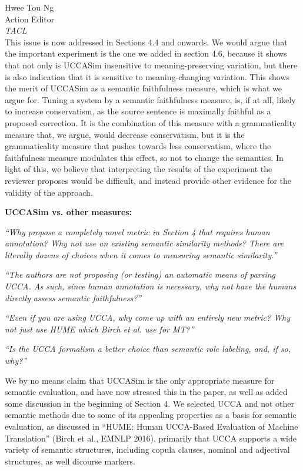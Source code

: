 \documentclass[11pt,letterpaper]{letter}
\begin{document}
\begin{letter}{%
Hwee Tou Ng\\
Action Editor\\
{\em TACL}\\
}
This issue is now addressed in Sections 4.4 and onwards.
We would argue that the important experiment is the one we added in section 4.6, because it shows that not only is UCCASim insensitive to meaning-preserving variation, but there is also indication that it is sensitive to meaning-changing variation. This shows the merit of UCCASim as a semantic faithfulness measure, which is what we argue for.
Tuning a system by a semantic faithfulness measure, is, if at all, likely to increase conservatism, as the source sentence is maximally faithful as a proposed correction. It is the combination of this measure with a grammaticality measure that, we argue, would decrease conservatism, but it is the grammaticality measure that pushes towards less conservatism, where the faithfulness measure modulates this effect, so not to change the semantics. In light of this, we believe that interpreting the results of the experiment the reviewer proposes would be difficult, and instead provide other evidence for the validity of the approach.


\vspace{.5cm}
{\large\bf UCCASim vs. other measures:}

\emph{``Why propose a completely novel metric in Section 4 that requires human
	annotation? Why not use an existing semantic similarity methods? There are
	literally dozens of choices when it comes to measuring semantic similarity.''}

	\emph{``The authors are not proposing (or
	testing) an automatic means of parsing UCCA. As such, since human annotation
	is necessary, why not have the humans directly assess semantic faithfulness?''}

\emph{``Even if you are using UCCA, why come up with an entirely new metric? Why not just use HUME which Birch et al. use for MT?''}


\emph {``Is the UCCA formalism a better choice than semantic role labeling, and, if so, why?''}

We by no means claim that UCCASim is the only appropriate measure for semantic evaluation, and have now stressed this in the paper, as well as added some discussion in the beginning of Section 4. We selected UCCA and not other semantic methods due to some of its appealing properties as a basis for semantic evaluation, as discussed in ``HUME: Human UCCA-Based Evaluation of Machine Translation'' (Birch et al., EMNLP 2016), primarily that UCCA supports a wide variety of semantic structures, including copula clauses, nominal and adjectival structures, as well dicourse markers.


\end{letter}
\end{document}
